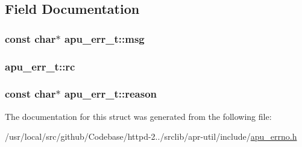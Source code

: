 \subsection{Field Documentation}
\subsubsection[{\texorpdfstring{msg}{msg}}]{\setlength{\rightskip}{0pt plus 5cm}const char$\ast$ apu\+\_\+err\+\_\+t\+::msg}\hypertarget{structapu__err__t_a00fa3bec74e3dff959ca0d774c35e8de}{}\label{structapu__err__t_a00fa3bec74e3dff959ca0d774c35e8de}
\subsubsection[{\texorpdfstring{rc}{rc}}]{ apu\+\_\+err\+\_\+t\+::rc}\hypertarget{structapu__err__t_a37afb348f7541d37cce9478769f02304}{}\label{structapu__err__t_a37afb348f7541d37cce9478769f02304}
\subsubsection[{\texorpdfstring{reason}{reason}}]{\setlength{\rightskip}{0pt plus 5cm}const char$\ast$ apu\+\_\+err\+\_\+t\+::reason}\hypertarget{structapu__err__t_a16327ba93834bf8f4a13663a714caa0b}{}\label{structapu__err__t_a16327ba93834bf8f4a13663a714caa0b}


The documentation for this struct was generated from the following file\+:\begin{DoxyCompactItemize}
\item 
/usr/local/src/github/\+Codebase/httpd-\/2../srclib/apr-\/util/include/\hyperlink{apu__errno_8h}{apu\+\_\+errno.\+h}\end{DoxyCompactItemize}

